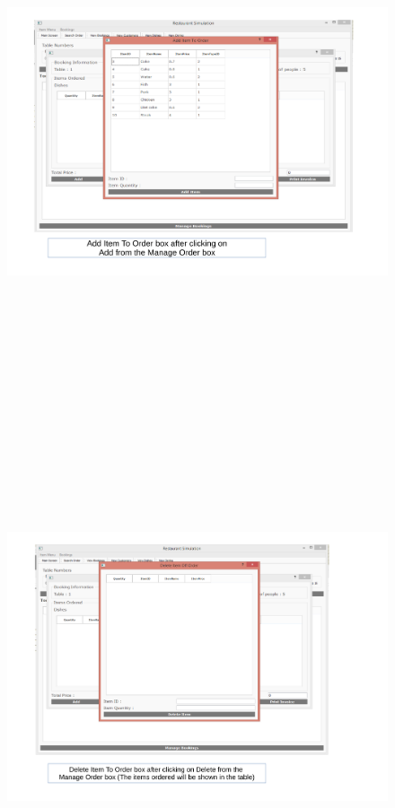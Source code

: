 \begin{landscape}
\begin{figure}[H]
    \includegraphics[height = 15cm]{./Maintenance/images/screen11}
    \caption{} \label{fig:screen11}
\end{figure}

\begin{figure}[H]
    \includegraphics[height = 15cm]{./Maintenance/images/screen12}
    \caption{} \label{fig:screen12}
\end{figure}


\end{landscape}
